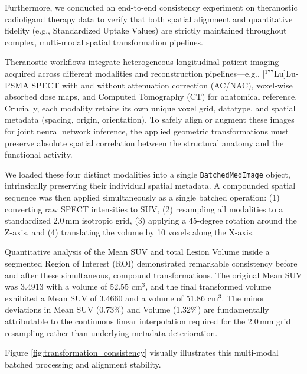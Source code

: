\documentclass[10pt,letterpaper]{article}
\begin{document}
Furthermore, we conducted an end-to-end consistency experiment on theranostic radioligand therapy data to verify that both spatial alignment and quantitative fidelity (e.g., Standardized Uptake Values) are strictly maintained throughout complex, multi-modal spatial transformation pipelines. 

Theranostic workflows integrate heterogeneous longitudinal patient imaging acquired across different modalities and reconstruction pipelines---e.g., [$^{177}$Lu]Lu-PSMA SPECT with and without attenuation correction (AC/NAC), voxel-wise absorbed dose maps, and Computed Tomography (CT) for anatomical reference. Crucially, each modality retains its own unique voxel grid, datatype, and spatial metadata (spacing, origin, orientation). To safely align or augment these images for joint neural network inference, the applied geometric transformations must preserve absolute spatial correlation between the structural anatomy and the functional activity.

We loaded these four distinct modalities into a single \texttt{BatchedMedImage} object, intrinsically preserving their individual spatial metadata. A compounded spatial sequence was then applied simultaneously as a single batched operation: (1) converting raw SPECT intensities to SUV, (2) resampling all modalities to a standardized 2.0\,mm isotropic grid, (3) applying a 45-degree rotation around the Z-axis, and (4) translating the volume by 10 voxels along the X-axis.

Quantitative analysis of the Mean SUV and total Lesion Volume inside a segmented Region of Interest (ROI) demonstrated remarkable consistency before and after these simultaneous, compound transformations. The original Mean SUV was 3.4913 with a volume of 52.55 $\text{cm}^3$, and the final transformed volume exhibited a Mean SUV of 3.4660 and a volume of 51.86 $\text{cm}^3$. The minor deviations in Mean SUV (0.73\%) and Volume (1.32\%) are fundamentally attributable to the continuous linear interpolation required for the 2.0\,mm grid resampling rather than underlying metadata deterioration. 

Figure \ref{fig:transformation_consistency} visually illustrates this multi-modal batched processing and alignment stability.
\end{document}
